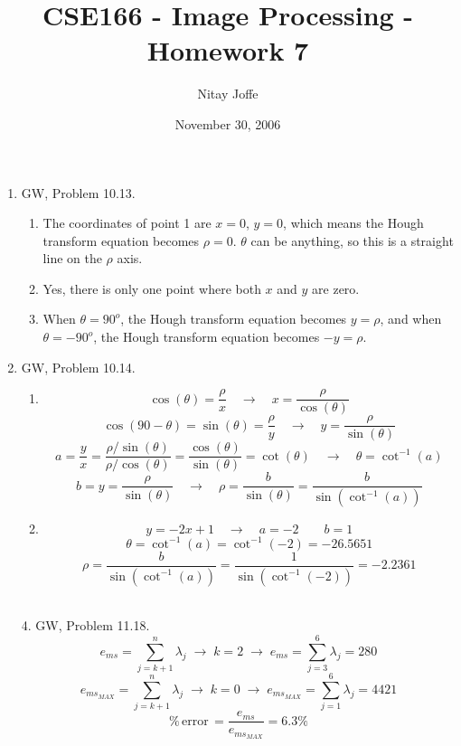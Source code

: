 \documentclass{article}
\title{CSE166 - Image Processing - Homework 7}
\author{Nitay Joffe}
\date{November 30, 2006}
\begin{document}
\maketitle

\begin{enumerate}
  \item
  GW, Problem 10.13.
  \begin{enumerate}
    \item
    The coordinates of point 1 are $x=0$, $y=0$, which means the Hough transform
    equation becomes $\rho=0$. $\theta$ can be anything, so this is a straight
    line on the $\rho$ axis.
    \item
    Yes, there is only one point where both $x$ and $y$ are zero.
    \item
    When $\theta=90^o$, the Hough transform equation becomes $y=\rho$, and when
    $\theta=-90^o$, the Hough transform equation becomes $-y=\rho$.\\
  \end{enumerate}
  \item GW, Problem 10.14.
  \begin{enumerate}
    \item
    $$\cos(\theta)=\frac{\rho}{x}\quad\to\quad x=\frac{\rho}{\cos(\theta)}$$
    $$\cos(90-\theta)=\sin(\theta)=\frac{\rho}{y}\quad\to\quad
      y=\frac{\rho}{\sin(\theta)}$$
    $$a=\frac{y}{x}=\frac{\rho/\sin(\theta)}{\rho/\cos(\theta)}
      =\frac{\cos(\theta)}{\sin(\theta)}=\cot(\theta)\quad\to\quad
      \theta=\cot^{-1}(a)$$
    $$b=y=\frac{\rho}{\sin(\theta)}\quad\to\quad
      \rho=\frac{b}{\sin(\theta)}=\frac{b}{\sin(\cot^{-1}(a))}$$
    \item
    $$y=-2x+1\quad\to\quad a=-2\qquad b=1$$
    $$\theta=\cot^{-1}(a)=\cot^{-1}(-2)=-26.5651$$
    $$\rho=\frac{b}{\sin(\cot^{-1}(a))}=\frac{1}{\sin(\cot^{-1}(-2))}
          =-2.2361$$\\
  \end{enumerate}
  \item[4.]GW, Problem 11.18.
  $$e_{ms}=\sum_{j=k+1}^{n}\lambda_j\;\to\;k=2\;\to\;e_{ms}
          =\sum_{j=3}^{6}\lambda_j=280$$
  $$e_{ms_{MAX}}=\sum_{j=k+1}^{n}\lambda_j\;\to\;k=0\;\to\;e_{ms_{MAX}}
                =\sum_{j=1}^{6}\lambda_j=4421$$
  $$\%\,\mathrm{error}\,=\frac{e_{ms}}{e_{ms_{MAX}}}=6.3\%$$\\
  

\end{enumerate}
\end{document}
